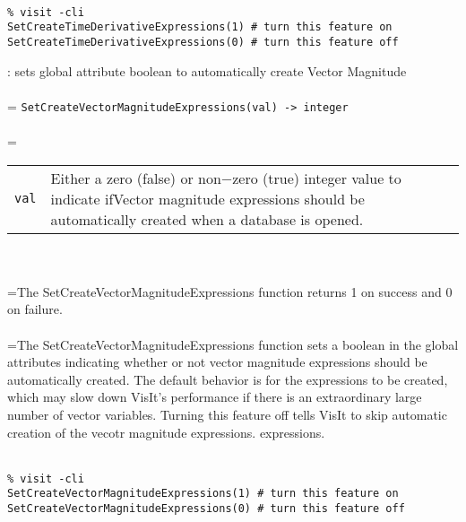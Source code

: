 \documentclass[10pt,a4paper]{report}
\begin{document}
\\[-6mm]
\begin{verbatim}% visit -cli
SetCreateTimeDerivativeExpressions(1) # turn this feature on
SetCreateTimeDerivativeExpressions(0) # turn this feature off
\end{verbatim}
\newpage


{}
: sets global attribute boolean to automatically create Vector Magnitude\\[-3mm]

 \\ 
\hangindent=\parindent 
\verb!SetCreateVectorMagnitudeExpressions(val) -> integer!\\ [-3mm]

 \\ 
\hangindent=\parindent 
\begin{tabular}{lp{9cm}}
\verb!val! & Either a zero (false) or non$-$zero (true) integer value to indicate ifVector magnitude expressions should be automatically created when a database is opened. \\
\end{tabular} \\[-2mm]


 \\ 
\hangindent=\parindent The SetCreateVectorMagnitudeExpressions function returns 1 on success and 0 on failure. \\[-3mm] 

 \\ 
\hangindent=\parindent The SetCreateVectorMagnitudeExpressions function sets a boolean in the  global attributes indicating whether or not vector magnitude expressions  should be automatically created. The default behavior is for the  expressions to be created, which may slow down VisIt's performance  if there is an extraordinary large number of vector variables.  Turning this  feature off tells VisIt to skip automatic creation of the vecotr magnitude expressions.  expressions. \\[-3mm] 

\\[-6mm]
\begin{verbatim}% visit -cli
SetCreateVectorMagnitudeExpressions(1) # turn this feature on
SetCreateVectorMagnitudeExpressions(0) # turn this feature off
\end{verbatim}
\newpage
\end{document}
